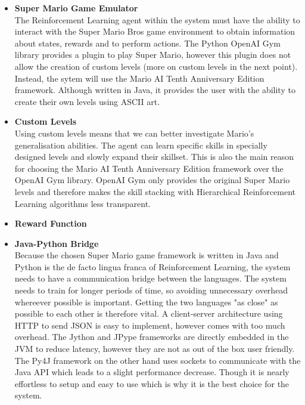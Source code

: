 \documentclass[notitlepage,a4paper,11pt]{article}
\begin{document}
\begin{itemize}

	\item \textbf{Super Mario Game Emulator}\\ 
	The Reinforcement Learning agent within the system must have the ability to interact with the Super Mario Bros game environment to obtain information about states, rewards and to perform actions. The Python OpenAI Gym library provides a plugin to play Super Mario, however this plugin does not allow the creation of custom levels (more on custom levels in the next point). Instead, the sytem will use the Mario AI Tenth Anniversary Edition \cite{marioai} framework. Although written in Java, it provides the user with the ability to create their own levels using ASCII art.
	
	\item \textbf{Custom Levels}\\
	Using custom levels means that we can better investigate Mario's generalisation abilities. The agent can learn specific skills in specially designed levels and slowly expand their skillset. This is also the main reason for choosing the Mario AI Tenth Anniversary Edition framework over the OpenAI Gym library. OpenAI Gym only provides the original Super Mario levels and therefore makes the skill stacking with Hierarchical Reinforcement Learning algorithms less transparent.
	
	\item \textbf{Reward Function}\\
	
	
	\item \textbf{Java-Python Bridge}\\
	Because the chosen Super Mario game framework is written in Java and Python is the de facto lingua franca of Reinforcement Learning, the system needs to have a communication bridge between the languages. The system needs to train for longer periods of time, so avoiding unnecessary overhead whereever possible is important. Getting the two languages "as close" as possible to each other is therefore vital. A client-server architecture using HTTP to send JSON is easy to implement, however comes with too much overhead. The Jython \cite{jython} and JPype \cite{jpype} frameworks are directly embedded in the JVM to reduce latency, however they are not as out of the box user friendly. The Py4J \cite{py4j} framework on the other hand uses sockets to communicate with the Java API which leads to a slight performance decrease. Though it is nearly effortless to setup and easy to use which is why it is the best choice for the system.
	

\end{itemize}
\end{document}
